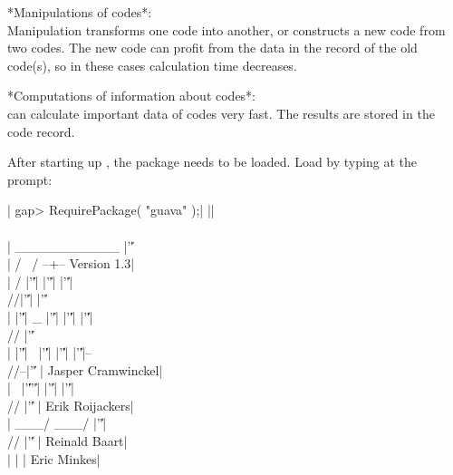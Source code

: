 *Manipulations of codes*:\\
Manipulation transforms  one code into  another, or constructs a new code
from two  codes. The new code can  profit from the  data in the record of
the old code(s), so in these cases calculation time decreases.

*Computations of information about codes*:\\
{\GUAVA} can calculate important data of codes very fast. The results are
stored in the code record.


After starting up {\GAP}, the  {\GUAVA} package needs  to be loaded. Load
{\GUAVA} by typing at the {\GAP} prompt:

|    gap> RequirePackage( "guava" );|
||\\\\|                  ___________                   |'\|'\\
|                 /            \           /   --+--  Version 1.3|\\
|                /      |'\|'|    |'\|'| |'\|'|\\        //|'\|'|    |'\|'\\
|               |'\|'|    _  |'\|'|    |'\|'| |'\|'| \\      // |'\|'\\
|               |'\|'|     \ |'\|'|    |'\|'| |'\|'|--\\    //--|'\|'%
|     Jasper Cramwinckel|\\
|                \     |'\|''\|'|    |'\|'| |'\|'|   \\  //   |'\|'%
|     Erik Roijackers|\\
|                 \___/  \___/ |'\|'|    \\//    |'\|'%
|     Reinald Baart|\\
|                                            |%
|     Eric Minkes|\\

